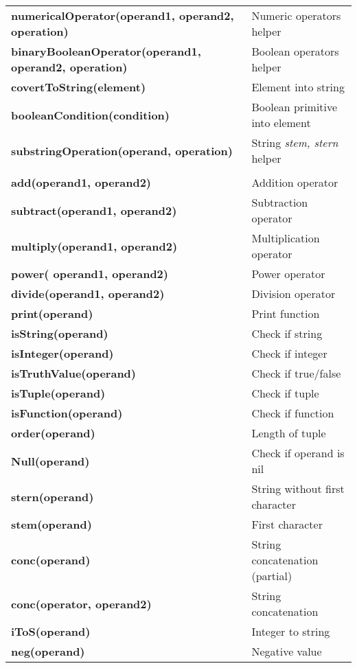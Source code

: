 \documentclass[12pt,a4paper]{article}
\begin{document}
    \begin{tabular}{lp{6cm}}
        \textbf{numericalOperator(operand1, operand2, operation)} & Numeric operators helper \\
        \textbf{binaryBooleanOperator(operand1, operand2, operation)} & Boolean operators helper \\
        \textbf{covertToString(element)} & Element into string\\
        \textbf{booleanCondition(condition)} & Boolean primitive into element \\
        \textbf{substringOperation(operand, operation)} & String \textit{stem, stern} helper\\ \\
        \textbf{add(operand1, operand2)} & Addition operator \\
        \textbf{subtract(operand1, operand2)} & Subtraction operator \\
        \textbf{multiply(operand1, operand2)} & Multiplication operator \\
        \textbf{power( operand1, operand2)} & Power operator \\
        \textbf{divide(operand1, operand2)} & Division operator \\
        \textbf{print(operand)} & Print function \\
        \textbf{isString(operand)} & Check if string \\
        \textbf{isInteger(operand)} & Check if integer \\
        \textbf{isTruthValue(operand)} & Check if true/false \\
        \textbf{isTuple(operand)} & Check if tuple \\
        \textbf{isFunction(operand)} & Check if function \\
        \textbf{order(operand)} & Length of tuple \\
        \textbf{Null(operand)} & Check if operand is nil \\
        \textbf{stern(operand)} & String without first character \\
        \textbf{stem(operand)} & First character \\
        \textbf{conc(operand)} & String concatenation (partial) \\
        \textbf{conc(operator, operand2)} & String concatenation \\
        \textbf{iToS(operand)} & Integer to string \\
        \textbf{neg(operand)} & Negative value \\

\end{tabular}
\end{document}
